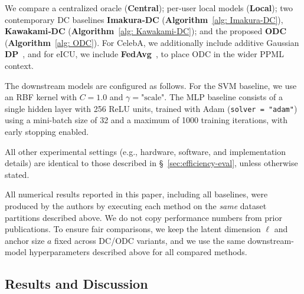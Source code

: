 \documentclass[final,3p,times]{elsarticle}
\theoremstyle{plain}
\begin{document}
We compare a centralized oracle (\textbf{Central}); per‑user local models (\textbf{Local}); two contemporary DC baselines \textbf{Imakura‑DC} (\textbf{Algorithm}~\ref{alg: Imakura-DC}), \textbf{Kawakami‑DC} (\textbf{Algorithm}~\ref{alg: Kawakami-DC}); and the proposed \textbf{ODC} (\textbf{Algorithm}~\ref{alg: ODC}). For CelebA, we additionally include additive Gaussian \textbf{DP}~\cite{analyticalgaussianmechanism}, and for eICU, we include \textbf{FedAvg}~\cite{FL1}, to place ODC in the wider PPML context.

The downstream models are configured as follows. For the SVM baseline, we use an RBF kernel with \(C = 1.0\) and \(\gamma = \text{"scale"}\). The MLP baseline consists of a single hidden layer with 256 ReLU units, trained with Adam (\texttt{solver = "adam"}) using a mini-batch size of 32 and a maximum of 1000 training iterations, with early stopping enabled.

All other experimental settings (e.g., hardware, software, and implementation details) are identical to those described in \S~\ref{sec:efficiency-eval}, unless otherwise stated.

All numerical results reported in this paper, including all baselines, were produced by the authors by executing each method on the \emph{same} dataset partitions described above. We do not copy performance numbers from prior publications. To ensure fair comparisons, we keep the latent dimension $\ell$ and anchor size $a$ fixed across DC/ODC variants, and we use the same downstream-model hyperparameters described above for all compared methods.

\subsection{Results and Discussion}
\label{subsec:results-discussion}
\end{document}
